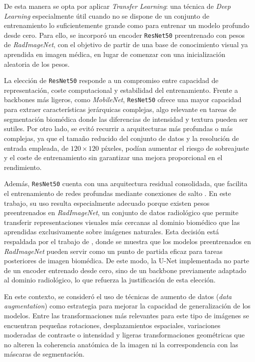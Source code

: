 De esta manera se opta por aplicar \textit{Transfer Learning}: una técnica de \textit{Deep Learning} especialmente útil cuando no se dispone de un conjunto de entrenamiento lo suficientemente grande como para entrenar un modelo profundo desde cero. Para ello, se incorporó un encoder \texttt{ResNet50} preentrenado con pesos de \textit{RadImageNet}, con el objetivo de partir de una base de conocimiento visual ya aprendida en imagen médica, en lugar de comenzar con una inicialización aleatoria de los pesos.

La elección de \texttt{ResNet50} responde a un compromiso entre capacidad de representación, coste computacional y estabilidad del entrenamiento. Frente a backbones más ligeros, como \textit{MobileNet}, \texttt{ResNet50} ofrece una mayor capacidad para extraer características jerárquicas complejas, algo relevante en tareas de segmentación biomédica donde las diferencias de intensidad y textura pueden ser sutiles. Por otro lado, se evitó recurrir a arquitecturas más profundas o más complejas, ya que el tamaño reducido del conjunto de datos y la resolución de entrada empleada, de \(120 \times 120\) píxeles, podían aumentar el riesgo de sobreajuste y el coste de entrenamiento sin garantizar una mejora proporcional en el rendimiento.

Además, \texttt{ResNet50} cuenta con una arquitectura residual consolidada, que facilita el entrenamiento de redes profundas mediante conexiones de salto \citep{he2016deep}. En este trabajo, su uso resulta especialmente adecuado porque existen pesos preentrenados en \textit{RadImageNet}, un conjunto de datos radiológico que permite transferir representaciones visuales más cercanas al dominio biomédico que las aprendidas exclusivamente sobre imágenes naturales. Esta decisión está respaldada por el trabajo de \citep{mei2022radimagenet}, donde se muestra que los modelos preentrenados en \textit{RadImageNet} pueden servir como un punto de partida eficaz para tareas posteriores de imagen biomédica. De este modo, la U-Net implementada no parte de un encoder entrenado desde cero, sino de un backbone previamente adaptado al dominio radiológico, lo que refuerza la justificación de esta elección.

En este contexto, se consideró el uso de técnicas de aumento de datos (\textit{data augmentation}) como estrategia para mejorar la capacidad de generalización de los modelos. Entre las transformaciones más relevantes para este tipo de imágenes se encuentran pequeñas rotaciones, desplazamientos espaciales, variaciones moderadas de contraste o intensidad y ligeras transformaciones geométricas que no alteren la coherencia anatómica de la imagen ni la correspondencia con las máscaras de segmentación.

